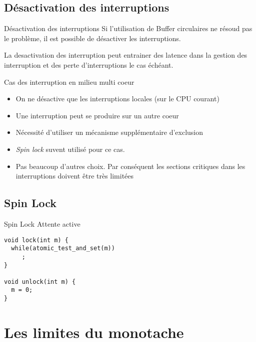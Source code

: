 \subsection{Désactivation des interruptions}

\begin{frame}{Désactivation des interruptions}
  Si l'utilisation de Buffer circulaires ne résoud pas le problème, il
  est possible de désactiver les interruptions.

  La desactivation des interruption peut entrainer des latence dans la
  gestion  des  interruption  et  des  perte  d'interruptions  le  cas
  échéant.
\end{frame}

\begin{frame}{Cas des interruption en milieu multi coeur}
  \begin{itemize} 
  \item  On ne  désactive que  les interruptions  locales (sur  le CPU
    courant)
  \item Une interruption peut se produire sur un autre coeur
  \item Nécessité d'utiliser un mécanisme supplémentaire d'exclusion
  \item \emph{Spin lock} suvent utilisé pour ce cas.
  \item  Pas beaucoup  d'autres  choix.  Par  conséquent les  sections
    critiques dans les interruptions doivent être très limitées
  \end{itemize} 
\end{frame} 

\subsection{Spin Lock}

\begin{frame}[fragile]{Spin Lock}
  Attente active
  \begin{lstlisting} 
void lock(int m) {
  while(atomic_test_and_set(m))
     ;
}

void unlock(int m) {
  m = 0;
}
  \end{lstlisting} 
\end{frame}

\section{Les limites du monotache}

